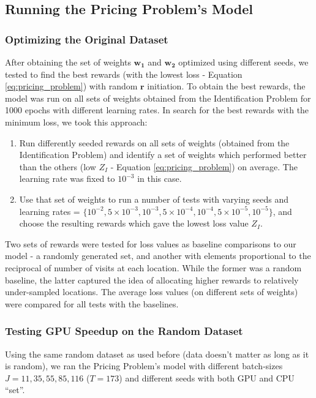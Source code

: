 \documentclass[12pt]{article}
\newcommand{\vect}[1]{\mathbf{#1}}  %
\newcommand{\matr}[1]{\mathbf{#1}}  %
\begin{document}
    \subsection{Running the Pricing Problem's Model} \label{sec:Running the Pricing Problem's Model}
    \subsubsection{Optimizing the Original Dataset} \label{sec:Pricing Problem-Optimizing the Original Dataset}
    After obtaining the set of weights $\matr{w_1}$ and $\matr{w_2}$ optimized using different seeds, we tested to find the best rewards (with the lowest loss - Equation \ref{eq:pricing_problem}) with random $\vect{r}$ initiation. To obtain the best rewards, the model was run on all sets of weights obtained from the Identification Problem for 1000 epochs with different learning rates. In search for the best rewards with the minimum loss, we took this approach:
    \begin{enumerate}
        \item Run differently seeded rewards on all sets of weights (obtained from the Identification Problem) and identify a set of weights which performed better than the others (low $Z_I$ - Equation \ref{eq:pricing_problem}) on average. The learning rate was fixed to $10^{-3}$ in this case.
        \item Use that set of weights to run a number of tests with varying seeds and learning rates = $\{10^{-2}, 5 \times 10^{-3}, 10^{-3}, 5 \times 10^{-4}, 10^{-4}, 5 \times 10^{-5}, 10^{-5}\}$, and choose the resulting rewards which gave the lowest loss value $Z_I$.
    \end{enumerate}
    Two sets of rewards were tested for loss values as baseline comparisons to our model - a randomly generated set, and another with elements proportional to the reciprocal of number of visits at each location. While the former was a random baseline, the latter captured the idea of allocating higher rewards to relatively under-sampled locations. The average loss values (on different sets of weights) were compared for all tests with the baselines.
    
    \subsubsection{Testing GPU Speedup on the Random Dataset} \label{sec:Pricing Problem-Testing GPU Speedup on the Random Dataset}
    Using the same random dataset as used before (data doesn't matter as long as it is random), we ran the Pricing Problem's model with different batch-sizes $J = 11, 35, 55, 85, 116$ ($T = 173$) and different seeds with both GPU and CPU ``set''.
    
\end{document}
